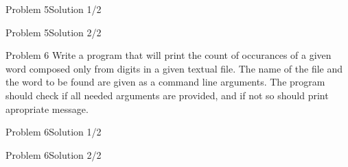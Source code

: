 \begin{frame}[fragile]{Problem 5}{Solution 1/2}

\end{frame}

\begin{frame}[fragile]{Problem 5}{Solution 2/2}

\end{frame}

\begin{frame}{Problem 6}
Write a program that will print the count of occurances of a given word
composed only from digits in a given textual file. The name of the file and the
word to be found are given as a command line arguments. The program should check
if all needed arguments are provided, and if not so should print apropriate
message. 
\end{frame}

\begin{frame}[fragile]{Problem 6}{Solution 1/2}

\end{frame}

\begin{frame}[fragile]{Problem 6}{Solution 2/2}

\end{frame}

